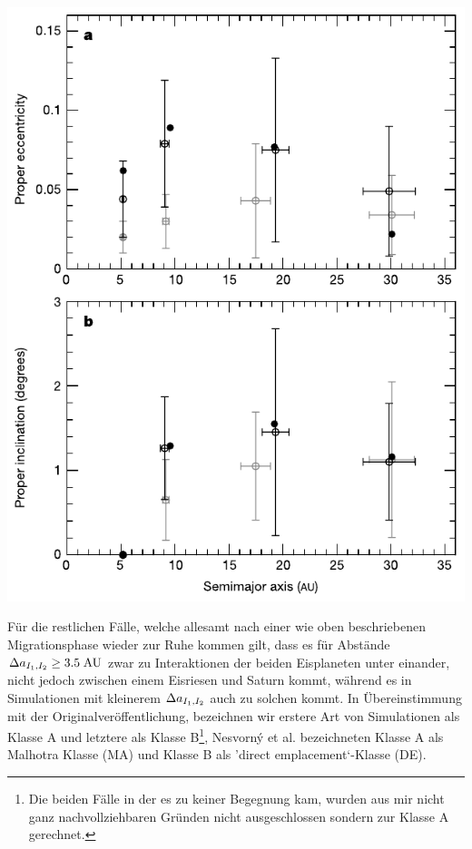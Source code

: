 \documentclass[10pt,a4paper,twoside]{article}
\renewenvironment{figure}{}{}
\begin{document}
\begin{figure}[tbn]
\includegraphics[scale=1]{img/Tsiganis2005-2.pdf}
\caption{•}
\end{figure}
Für die restlichen Fälle, welche allesamt nach einer wie oben beschriebenen Migrationsphase wieder zur Ruhe kommen %
gilt, dass es für Abstände $\Delta a_{I_1,I_2} \ge 3.5 \;\mathrm{AU}$ zwar zu Interaktionen der beiden Eisplaneten unter einander, nicht jedoch zwischen einem Eisriesen und Saturn kommt, während es in Simulationen mit kleinerem $\Delta a_{I_1,I_2}$ auch zu solchen kommt. In Übereinstimmung mit der Originalveröffentlichung, bezeichnen wir erstere Art von Simulationen als Klasse A und letztere als Klasse B\footnote{Die beiden Fälle in der es zu keiner Begegnung kam, wurden aus mir nicht ganz nachvollziehbaren Gründen nicht ausgeschlossen sondern zur Klasse A gerechnet.}, Nesvorný et al. bezeichneten Klasse A als Malhotra Klasse (MA) und Klasse B als 'direct emplacement`-Klasse (DE)\cite{Nesvorny2007}. %
\end{document}
